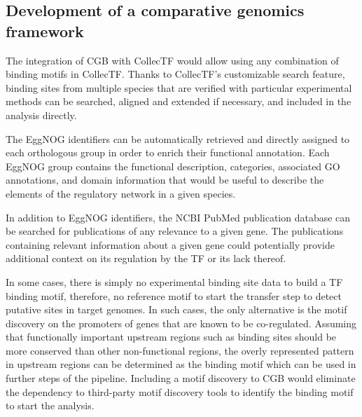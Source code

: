 \subsection{Development of a comparative genomics framework}

The integration of CGB with CollecTF would allow using any combination of
binding motifs in CollecTF\@. Thanks to CollecTF's customizable search feature,
binding sites from multiple species that are verified with particular
experimental methods can be searched, aligned and extended if necessary, and
included in the analysis directly.

The EggNOG identifiers can be automatically retrieved and directly assigned to
each orthologous group in order to enrich their functional annotation. Each
EggNOG group contains the functional description, categories, associated GO
annotations, and domain information that would be useful to describe the
elements of the regulatory network in a given species.

In addition to EggNOG identifiers, the NCBI PubMed publication database can be
searched for publications of any relevance to a given gene. The publications
containing relevant information about a given gene could potentially provide
additional context on its regulation by the TF or its lack thereof.

In some cases, there is simply no experimental binding site data to build a TF
binding motif, therefore, no reference motif to start the transfer step to
detect putative sites in target genomes. In such cases, the only alternative is
the motif discovery on the promoters of genes that are known to be
co-regulated. Assuming that functionally important upstream regions such as
binding sites should be more conserved than other non-functional regions, the
overly represented pattern in upstream regions can be determined as the binding
motif which can be used in further steps of the pipeline. Including a motif
discovery to CGB would eliminate the dependency to third-party motif discovery
tools to identify the binding motif to start the analysis.
